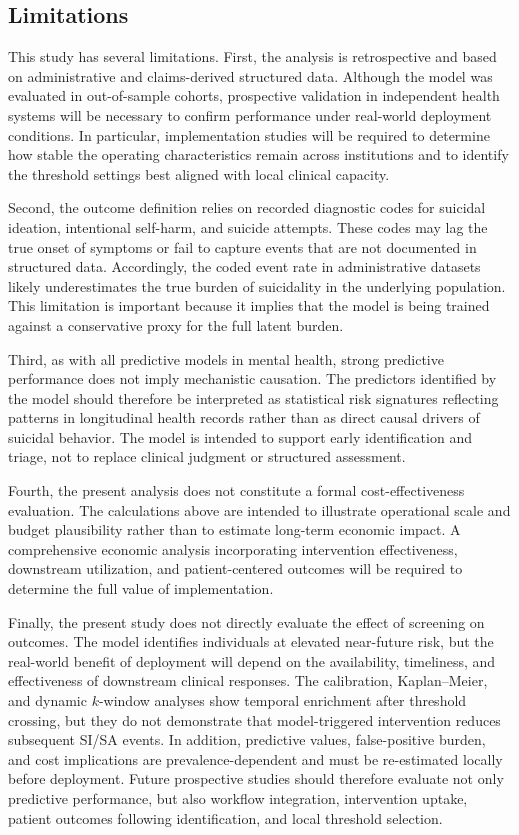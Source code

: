 \documentclass[onecolumn, compsoc,11pt]{IEEEtran}
\begin{document}
\subsection*{Limitations}

This study has several limitations. First, the analysis is retrospective and based on administrative and claims-derived structured data. Although the model was evaluated in out-of-sample cohorts, prospective validation in independent health systems will be necessary to confirm performance under real-world deployment conditions. In particular, implementation studies will be required to determine how stable the operating characteristics remain across institutions and to identify the threshold settings best aligned with local clinical capacity.

Second, the outcome definition relies on recorded diagnostic codes for suicidal ideation, intentional self-harm, and suicide attempts. These codes may lag the true onset of symptoms or fail to capture events that are not documented in structured data. Accordingly, the coded event rate in administrative datasets likely underestimates the true burden of suicidality in the underlying population. This limitation is important because it implies that the model is being trained against a conservative proxy for the full latent burden.

Third, as with all predictive models in mental health, strong predictive performance does not imply mechanistic causation. The predictors identified by the model should therefore be interpreted as statistical risk signatures reflecting patterns in longitudinal health records rather than as direct causal drivers of suicidal behavior. The model is intended to support early identification and triage, not to replace clinical judgment or structured assessment.

Fourth, the present analysis does not constitute a formal cost-effectiveness evaluation. The calculations above are intended to illustrate operational scale and budget plausibility rather than to estimate long-term economic impact. A comprehensive economic analysis incorporating intervention effectiveness, downstream utilization, and patient-centered outcomes will be required to determine the full value of implementation.

Finally, the present study does not directly evaluate the effect of screening on outcomes. The model identifies individuals at elevated near-future risk, but the real-world benefit of deployment will depend on the availability, timeliness, and effectiveness of downstream clinical responses. The calibration, Kaplan--Meier, and dynamic \(k\)-window analyses show temporal enrichment after threshold crossing, but they do not demonstrate that model-triggered intervention reduces subsequent SI/SA events. In addition, predictive values, false-positive burden, and cost implications are prevalence-dependent and must be re-estimated locally before deployment. Future prospective studies should therefore evaluate not only predictive performance, but also workflow integration, intervention uptake, patient outcomes following identification, and local threshold selection.
\end{document}
